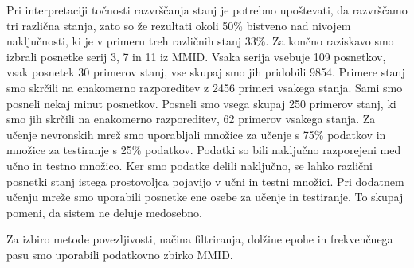 \thispagestyle{fancy}
Pri interpretaciji točnosti razvrščanja stanj je potrebno upoštevati, da razvrščamo tri različna stanja, zato so že rezultati okoli 50\% bistveno nad nivojem naključnosti, ki je v primeru treh različnih stanj 33\%.
Za končno raziskavo smo izbrali posnetke serij 3, 7 in 11 iz MMID. Vsaka serija vsebuje 109 posnetkov, vsak posnetek 30 primerov stanj, vse skupaj smo jih pridobili 9854. Primere stanj smo skrčili na enakomerno razporeditev z 2456 primeri vsakega stanja. Sami smo posneli nekaj minut posnetkov. Posneli smo vsega skupaj 250 primerov stanj, ki smo jih skrčili na enakomerno razporeditev, 62 primerov vsakega stanja. Za učenje nevronskih mrež smo uporabljali množice za učenje s 75\% podatkov in množice za testiranje s 25\% podatkov. Podatki so bili naključno razporejeni med učno in testno množico. Ker smo podatke delili naključno, se lahko različni posnetki stanj istega prostovoljca pojavijo v učni in testni množici. Pri dodatnem učenju mreže smo uporabili posnetke ene osebe za učenje in testiranje. To skupaj pomeni, da sistem ne deluje medosebno.


Za izbiro metode povezljivosti, načina filtriranja, dolžine epohe in frekvenčnega pasu smo uporabili podatkovno zbirko MMID.

